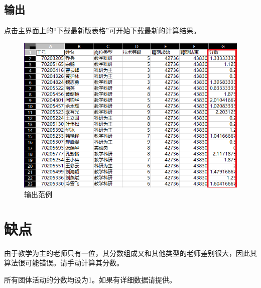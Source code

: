 \documentclass[UTF8,fontset=windowsnew]{ctexart}
\begin{document}
\subsection{输出}
点击主界面上的``下载最新版表格''可开始下载最新的计算结果。
\begin{figure}[h]
  \centering
  \includegraphics[width=.5\textwidth]{image/output.png}
  \caption{输出范例}
  \label{fig:output}
\end{figure}
\section{缺点}
由于教学为主的老师只有一位，其分数组成又和其他类型的老师差别很大，因此其算法很可能错误。请手动计算其分数。\par
所有团体活动的分数均设为1。如果有详细数据请提供。\par
\end{document}
